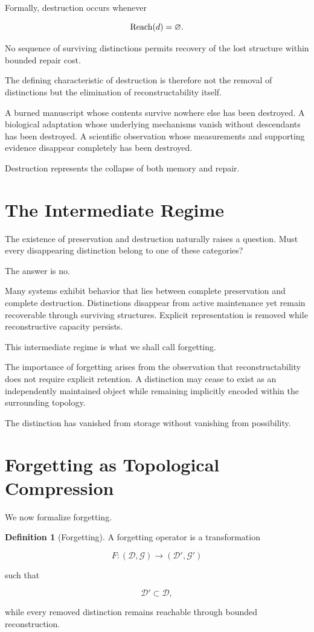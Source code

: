 \documentclass[12pt,oneside]{book}
\theoremstyle{plain} \newtheorem{theorem}{Theorem}[chapter] \newtheorem{lemma}[theorem]{Lemma} \newtheorem{proposition}[theorem]{Proposition} \newtheorem{corollary}[theorem]{Corollary}
\theoremstyle{definition} \newtheorem{definition}[theorem]{Definition} \newtheorem{axiom}[theorem]{Axiom} \newtheorem{construction}[theorem]{Construction}
\theoremstyle{remark} \newtheorem{remark}[theorem]{Remark} \newtheorem{example}[theorem]{Example}
\newcommand{\D}{\mathcal{D}} \newcommand{\R}{\mathcal{R}} \newcommand{\F}{\mathcal{F}} \newcommand{\U}{\mathcal{U}} \newcommand{\M}{\mathcal{M}} \newcommand{\G}{\Gamma}
\begin{document}
Formally, destruction occurs whenever

\[
\operatorname{Reach}(d)
=
\varnothing.
\]

No sequence of surviving distinctions permits recovery of the lost structure within bounded repair cost.

The defining characteristic of destruction is therefore not the removal of distinctions but the elimination of reconstructability itself.

A burned manuscript whose contents survive nowhere else has been destroyed. A biological adaptation whose underlying mechanisms vanish without descendants has been destroyed. A scientific observation whose measurements and supporting evidence disappear completely has been destroyed.

Destruction represents the collapse of both memory and repair.

\section{The Intermediate Regime}

The existence of preservation and destruction naturally raises a question. Must every disappearing distinction belong to one of these categories?

The answer is no.

Many systems exhibit behavior that lies between complete preservation and complete destruction. Distinctions disappear from active maintenance yet remain recoverable through surviving structures. Explicit representation is removed while reconstructive capacity persists.

This intermediate regime is what we shall call forgetting.

The importance of forgetting arises from the observation that reconstructability does not require explicit retention. A distinction may cease to exist as an independently maintained object while remaining implicitly encoded within the surrounding topology.

The distinction has vanished from storage without vanishing from possibility.

\section{Forgetting as Topological Compression}

We now formalize forgetting.

\begin{definition}[Forgetting]
A forgetting operator is a transformation

\[
F:(\D,\mathcal G)
\rightarrow
(\D',\mathcal G')
\]

such that

\[
\D'
\subset
\D,
\]

while every removed distinction remains reachable through bounded reconstruction.
\end{definition}
\end{document}
